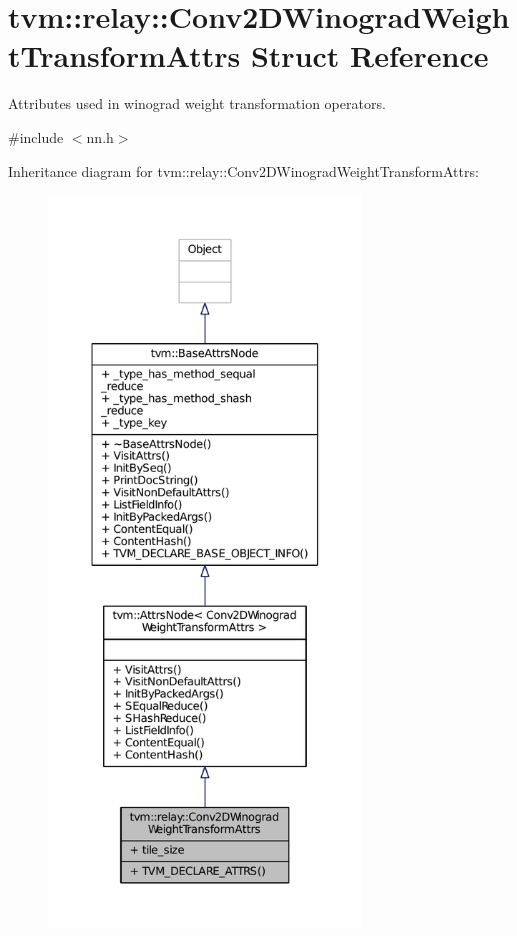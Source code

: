\hypertarget{structtvm_1_1relay_1_1Conv2DWinogradWeightTransformAttrs}{}\section{tvm\+:\+:relay\+:\+:Conv2\+D\+Winograd\+Weight\+Transform\+Attrs Struct Reference}
\label{structtvm_1_1relay_1_1Conv2DWinogradWeightTransformAttrs}


Attributes used in winograd weight transformation operators.  




{\ttfamily \#include $<$nn.\+h$>$}



Inheritance diagram for tvm\+:\+:relay\+:\+:Conv2\+D\+Winograd\+Weight\+Transform\+Attrs\+:
\nopagebreak
\begin{figure}[H]
\begin{center}
\leavevmode
\includegraphics[height=550pt]{structtvm_1_1relay_1_1Conv2DWinogradWeightTransformAttrs__inherit__graph}
\end{center}
\end{figure}


